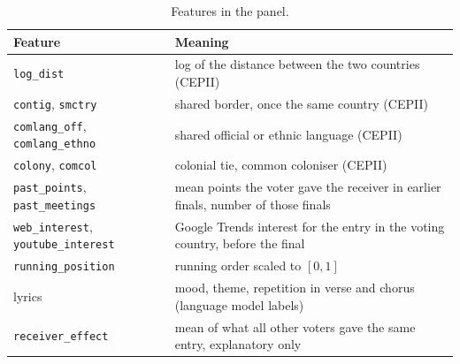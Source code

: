 \begin{table}[h]
\centering\small
\begin{tabular}{@{}ll@{}}
\toprule
Feature & Meaning\\
\midrule
\texttt{log\_dist} & log of the distance between the two countries (CEPII)\\
\texttt{contig}, \texttt{smctry} & shared border, once the same country (CEPII)\\
\texttt{comlang\_off}, \texttt{comlang\_ethno} & shared official or ethnic language (CEPII)\\
\texttt{colony}, \texttt{comcol} & colonial tie, common coloniser (CEPII)\\
\texttt{past\_points}, \texttt{past\_meetings} & mean points the voter gave the receiver in earlier finals, number of those finals\\
\texttt{web\_interest}, \texttt{youtube\_interest} & Google Trends interest for the entry in the voting country, before the final\\
\texttt{running\_position} & running order scaled to $[0,1]$\\
lyrics & mood, theme, repetition in verse and chorus (language model labels)\\
\texttt{receiver\_effect} & mean of what all other voters gave the same entry, explanatory only\\
\bottomrule
\end{tabular}
\caption{Features in the panel.}
\label{tab:features}
\end{table}
